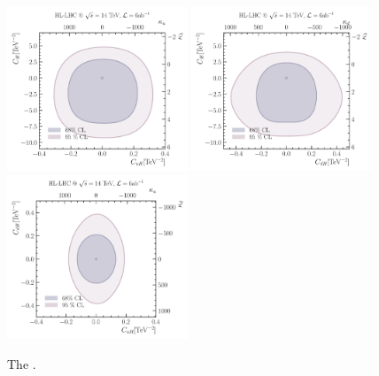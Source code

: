 \begin{figure}[htpb!]
	\centering
	\includegraphics[width=0.48\textwidth]{fig/kukl-HL-LHC} %
	\includegraphics[width=0.48\textwidth]{fig/kdkl-HL-LHC} 
	\includegraphics[width=0.48\textwidth]{fig/kdku-HL-LHC}  \\
	\caption{The . }
	\label{fig:rescut}
\end{figure}  

